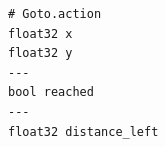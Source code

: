 \documentclass[preview,border=2pt]{standalone}
\begin{document}
\begin{lstlisting}[style=textstyle]
# Goto.action
float32 x
float32 y
---
bool reached
---
float32 distance_left
\end{lstlisting}
\end{document}
